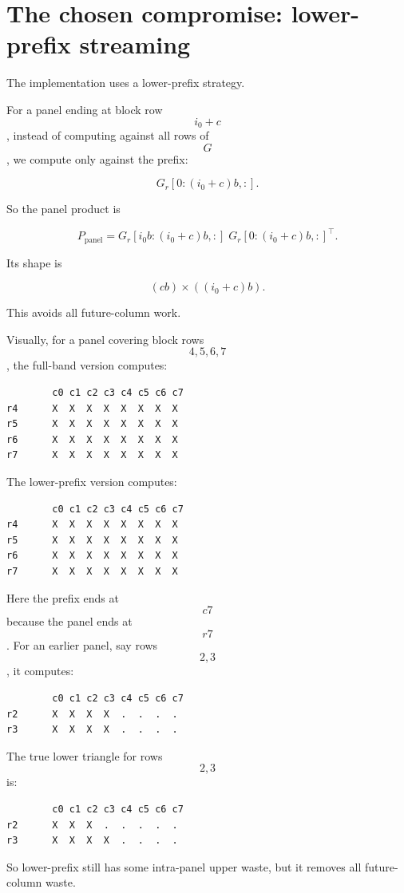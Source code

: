 \documentclass[11pt]{article}
\begin{document}
\section{The chosen compromise: lower-prefix streaming}

The implementation uses a lower-prefix strategy.

For a panel ending at block row $$i_0+c$$, instead of computing against all rows of $$G$$, we compute only against the prefix:

$$
G_r[0 : (i_0+c)b, :].
$$

So the panel product is

$$
P_{\text{panel}}
=
G_r[i_0b : (i_0+c)b, :]
\;
G_r[0 : (i_0+c)b, :]^\top.
$$

Its shape is

$$
(cb) \times ((i_0+c)b).
$$

This avoids all future-column work.

Visually, for a panel covering block rows $$4,5,6,7$$, the full-band version computes:

\begin{lstlisting}
        c0 c1 c2 c3 c4 c5 c6 c7
r4      X  X  X  X  X  X  X  X
r5      X  X  X  X  X  X  X  X
r6      X  X  X  X  X  X  X  X
r7      X  X  X  X  X  X  X  X
\end{lstlisting}

The lower-prefix version computes:

\begin{lstlisting}
        c0 c1 c2 c3 c4 c5 c6 c7
r4      X  X  X  X  X  X  X  X
r5      X  X  X  X  X  X  X  X
r6      X  X  X  X  X  X  X  X
r7      X  X  X  X  X  X  X  X
\end{lstlisting}

Here the prefix ends at $$c7$$ because the panel ends at $$r7$$. For an earlier panel, say rows $$2,3$$, it computes:

\begin{lstlisting}
        c0 c1 c2 c3 c4 c5 c6 c7
r2      X  X  X  X  .  .  .  .
r3      X  X  X  X  .  .  .  .
\end{lstlisting}

The true lower triangle for rows $$2,3$$ is:

\begin{lstlisting}
        c0 c1 c2 c3 c4 c5 c6 c7
r2      X  X  X  .  .  .  .  .
r3      X  X  X  X  .  .  .  .
\end{lstlisting}

So lower-prefix still has some intra-panel upper waste, but it removes all future-column waste.
\end{document}
